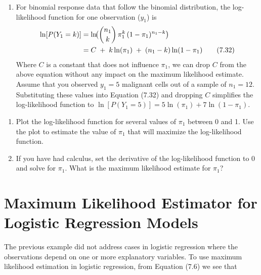 \documentclass[
]{report}
\providecommand{\tightlist}{%
  \setlength{\itemsep}{0pt}\setlength{\parskip}{0pt}}
\begin{document}
\begin{enumerate}
\def\labelenumi{\arabic{enumi}.}
\setcounter{enumi}{33}
\tightlist
\item
  For binomial response data that follow the binomial distribution, the log-likelihood function for one observation (\(y_1\)) is\\
  \begin{align}
  \ln[P(Y_1 = k)]
  &= \ln\!\bigl(\binom{n_1}{k}\,\pi_1^k\,(1 - \pi_1)^{n_1 - k}\bigr) \notag \\
  &= C \;+\;k\ln(\pi_1)\;+\;(n_1 - k)\ln(1 - \pi_1)
  \tag{7.32}
  \end{align}
  Where \(C\) is a constant that does not influence \(\pi_1\), we can drop \(C\) from the above equation without any impact on the maximum likelihood estimate. Assume that you observed \(y_1 = 5\) malignant cells out of a sample of \(n_1 = 12\). Substituting these values into Equation (7.32) and dropping \(C\) simplifies the log-likelihood function to \(\ln[P(Y_1 = 5)] = 5\ln(\pi_1) + 7\ln(1 - \pi_1).\)
\end{enumerate}

\begin{enumerate}
\def\labelenumi{\alph{enumi}.}
\tightlist
\item
  Plot the log-likelihood function for several values of \(\pi_1\) between 0 and 1. Use the plot to estimate the value of \(\pi_1\) that will maximize the log-likelihood function.\\
\item
  If you have had calculus, set the derivative of the log-likelihood function to 0 and solve for \(\pi_1\). What is the maximum likelihood estimate for \(\pi_1\)?
\end{enumerate}

\hypertarget{maximum-likelihood-estimator-for-logistic-regression-models-1}{%
\section*{Maximum Likelihood Estimator for Logistic Regression Models}\label{maximum-likelihood-estimator-for-logistic-regression-models-1}}

The previous example did not address cases in logistic regression where the observations depend on one or more explanatory variables. To use maximum likelihood estimation in logistic regression, from Equation (7.6) we see that
\end{document}
